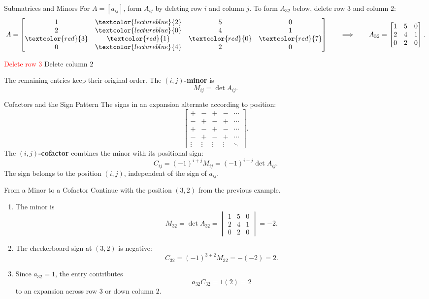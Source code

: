 \begin{frame}{Submatrices and Minors}
For $A=[a_{ij}]$, form $A_{ij}$ by deleting row $i$ and column $j$.
To form $A_{32}$ below, delete row $3$ and column $2$:
\[
A=\begin{bmatrix}
1&\textcolor{lectureblue}{2}&5&0\\
2&\textcolor{lectureblue}{0}&4&1\\
\textcolor{red}{3}&\textcolor{red}{1}&\textcolor{red}{0}&\textcolor{red}{7}\\
0&\textcolor{lectureblue}{4}&2&0
\end{bmatrix}
\qquad\Longrightarrow\qquad
A_{32}=\begin{bmatrix}1&5&0\\2&4&1\\0&2&0\end{bmatrix}.
\]
\begin{center}
\textcolor{red}{Delete row $3$}
\qquad
\textcolor{lectureblue}{Delete column $2$}
\end{center}
\pause
The remaining entries keep their original order. The \textbf{$(i,j)$-minor} is
\[
M_{ij}=\det A_{ij}.
\]
\end{frame}

\begin{frame}{Cofactors and the Sign Pattern}
The signs in an expansion alternate according to position:
\[
\begin{bmatrix}
+&-&+&- &\cdots\\
-&+&-&+ &\cdots\\
+&-&+&- &\cdots\\
-&+&-&+ &\cdots\\
\vdots&\vdots&\vdots&\vdots&\ddots
\end{bmatrix}.
\]
\pause
The \textbf{$(i,j)$-cofactor} combines the minor with its positional sign:
\[
C_{ij}=(-1)^{i+j}M_{ij}=(-1)^{i+j}\det A_{ij}.
\]
\pause
The sign belongs to the position $(i,j)$, independent of the sign of $a_{ij}$.
\end{frame}

\begin{frame}{From a Minor to a Cofactor}
Continue with the position $(3,2)$ from the previous example.
\begin{enumerate}
  \item The minor is
  \[
  M_{32}=\det A_{32}
  =\begin{vmatrix}1&5&0\\2&4&1\\0&2&0\end{vmatrix}=-2.
  \]
  \pause
  \item The checkerboard sign at $(3,2)$ is negative:
  \[
  C_{32}=(-1)^{3+2}M_{32}=-(-2)=2.
  \]
  \pause
  \item Since $a_{32}=1$, the entry contributes
  \[
  a_{32}C_{32}=1(2)=2
  \]
  to an expansion across row $3$ or down column $2$.
\end{enumerate}
\end{frame}

